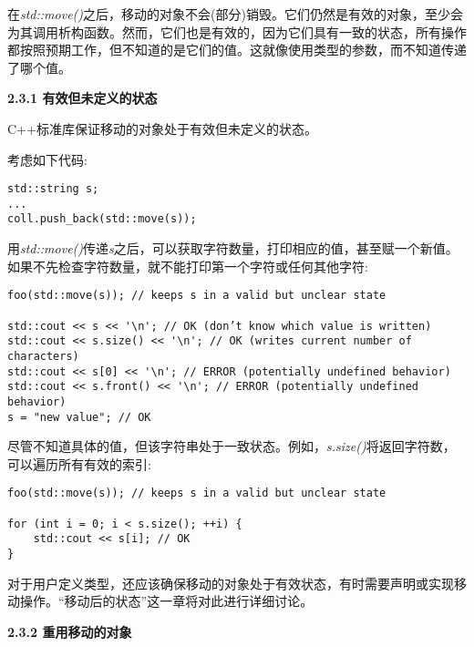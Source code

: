 在\textit{std::move()}之后，移动的对象不会(部分)销毁。它们仍然是有效的对象，至少会为其调用析构函数。然而，它们也是有效的，因为它们具有一致的状态，所有操作都按照预期工作，但不知道的是它们的值。这就像使用类型的参数，而不知道传递了哪个值。\par

\hspace*{\fill} \par %
\textbf{2.3.1 有效但未定义的状态}

C++标准库保证移动的对象处于有效但未定义的状态。\par

考虑如下代码:\par

\begin{lstlisting}[caption={}]
std::string s;
...
coll.push_back(std::move(s));
\end{lstlisting}

用\textit{std::move()}传递\textit{s}之后，可以获取字符数量，打印相应的值，甚至赋一个新值。如果不先检查字符数量，就不能打印第一个字符或任何其他字符:\par

\begin{lstlisting}[caption={}]
foo(std::move(s)); // keeps s in a valid but unclear state

std::cout << s << '\n'; // OK (don’t know which value is written)
std::cout << s.size() << '\n'; // OK (writes current number of characters)
std::cout << s[0] << '\n'; // ERROR (potentially undefined behavior)
std::cout << s.front() << '\n'; // ERROR (potentially undefined behavior)
s = "new value"; // OK
\end{lstlisting}

尽管不知道具体的值，但该字符串处于一致状态。例如，\textit{s.size()}将返回字符数，可以遍历所有有效的索引:\par

\begin{lstlisting}[caption={}]
foo(std::move(s)); // keeps s in a valid but unclear state

for (int i = 0; i < s.size(); ++i) {
	std::cout << s[i]; // OK
}
\end{lstlisting}

对于用户定义类型，还应该确保移动的对象处于有效状态，有时需要声明或实现移动操作。“移动后的状态”这一章将对此进行详细讨论。\par

\hspace*{\fill} \par %
\textbf{2.3.2 重用移动的对象}

